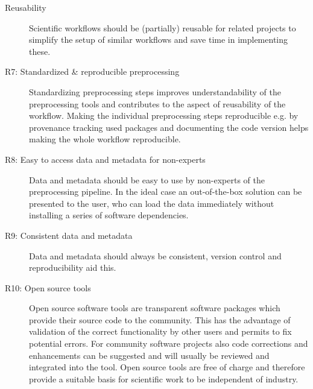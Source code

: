 \begin{description}
 \item[Reusability] Scientific workflows should be (partially) reusable for related projects to simplify the setup of similar workflows and save time in implementing these.
 \item[R7: Standardized \& reproducible preprocessing] Standardizing preprocessing steps improves understandability of the preprocessing tools and contributes to the aspect of reusability of the workflow. Making the individual preprocessing steps reproducible e.g. by provenance tracking used packages and documenting the code version helps making the whole workflow reproducible.
 \item[R8: Easy to access data and metadata for non-experts] Data and metadata should be easy to use by non-experts of the preprocessing pipeline. In the ideal case an out-of-the-box solution can be presented to the user, who can load the data immediately without installing a series of software dependencies. 
 \item[R9: Consistent data and metadata] Data and metadata should always be consistent, version control and reproducibility aid this.
 \item[R10: Open source tools] Open source software tools are transparent software packages which provide their source code to the community. This has the advantage of validation of the correct functionality by other users and permits to fix potential errors. For community software projects also code corrections and enhancements can be suggested and will usually be reviewed and integrated into the tool. Open source tools are free of charge and therefore provide a suitable basis for scientific work to be independent of industry.
\end{description}


